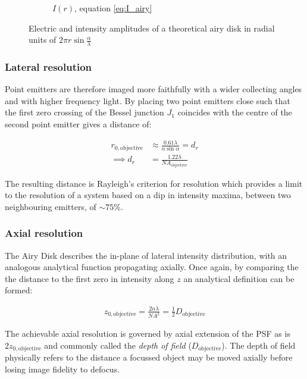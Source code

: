 \begin{figure}
\begin{subfigure}[b]{\textwidth}
        \caption{$I(r)$, equation \eqref{eq:I_airy}}
        \label{fig:airy_I_fill}
    \end{subfigure}
    \caption{Electric and intensity amplitudes of a theoretical airy disk in radial units of $2\pi r \sin \frac{\alpha}{\lambda}$}
    \label{fig:airy_disk}
\end{figure}

\subsubsection{Lateral resolution}

Point emitters are therefore imaged more faithfully with a wider collecting angles and with higher frequency light.
By placing two point emitters close such that the first zero crossing of the Bessel junction $J_1$ coincides with the centre of the second point emitter gives a distance of:

\begin{align}
    r_{0,\text{objective}} &\approx \frac{0.61\lambda}{n\sin\alpha} = d_r \label{eq:lateral_res}\\
    \implies d_r &= \frac{1.22 \lambda}{NA_{\text{objective}}}
\end{align}

The resulting distance is Rayleigh's criterion for resolution which provides a limit to the resolution of a system based on a dip in intensity maxima, between two neighbouring emitters, of $\sim 75\%$.

\subsubsection{Axial resolution}

The Airy Disk describes the in-plane of lateral intensity distribution, with an analogous analytical function propagating axially.
Once again, by comparing the the distance to the first zero in intensity along $z$ an analytical definition can be formed:

\begin{align}
    z_{0,\text{objective}} = \frac{2n\lambda}{{NA}^2} \label{eq:axial_res} = \frac{1}{2} D_{\text{objective}}
\end{align}

The achievable axial resolution is governed by axial extension of the PSF as is $2z_{0,\text{objective}}$ and commonly called the \emph{depth of field} ($D_{\text{objective}}$).
The depth of field physically refers to the distance a focussed object may be moved axially before losing image fidelity to defocus.


